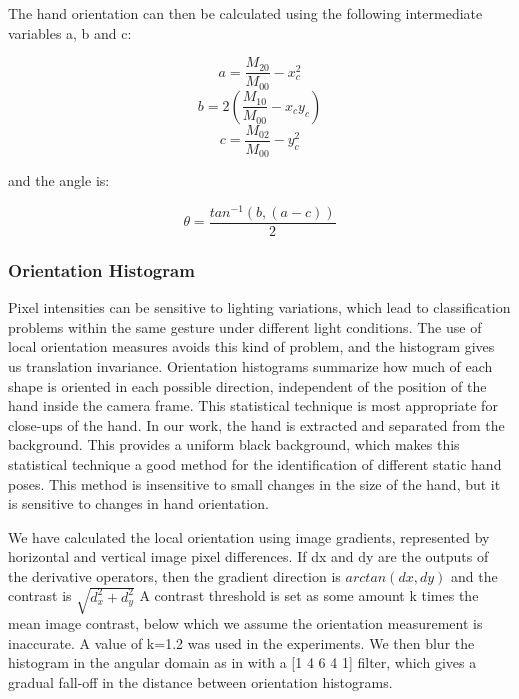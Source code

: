 \documentclass[12pt,fleqn]{book} %
\begin{document}
\bigskip
The hand orientation can then be calculated using the following intermediate variables a, b and c:
\bigskip
\begin{dBox}
\begin{equation}
	a = \frac{M_{20}}{M_{00}} - x_{c}^{2}
\end{equation}
\begin{equation}
	b = 2 (\frac{M_{10}}{M_{00}}-x_{c}y_{c})
\end{equation}
\begin{equation}
    c = \frac{M_{02}}{M_{00}}- y_{c}^{2}
\end{equation}
\end{dBox}
\bigskip
and the angle is:
\begin{dBox}
\begin{equation}
\theta = \frac{tan^{-1}(b,(a-c))}{2}
\end{equation}
\end{dBox}
\bigskip
\subsubsection{Orientation Histogram}
Pixel intensities can be sensitive to lighting variations,
which lead to classification problems within the same gesture under different light conditions. The use of local
orientation measures avoids this kind of problem, and the
histogram gives us translation invariance. Orientation
histograms summarize how much of each shape is oriented in each possible direction, independent of the position of the hand inside the camera frame. This statistical technique is most appropriate for close-ups of the hand. In our work, the hand is extracted and separated from the background. This provides a uniform black background, which makes this statistical technique a good method for the identification of different static hand poses. This method is insensitive to small changes in the size of the hand, but it is sensitive to changes in hand orientation.\bigskip

We have calculated the local orientation using image gradients, represented by horizontal and vertical image pixel differences. If dx and dy are the outputs of the derivative operators, then the gradient direction is $arctan(dx,dy)$ and the contrast is  $\sqrt{d_{x}^{2}+d_{y}^{2}}$ A contrast threshold is set as some amount k times the mean image contrast, below which we assume the orientation measurement is inaccurate. A value of k=1.2 was used in the experiments. We then blur the histogram in the angular domain as in with a [1 4 6 4 1] filter, which gives a gradual fall-off in the distance between orientation histograms.\bigskip
\end{document}
